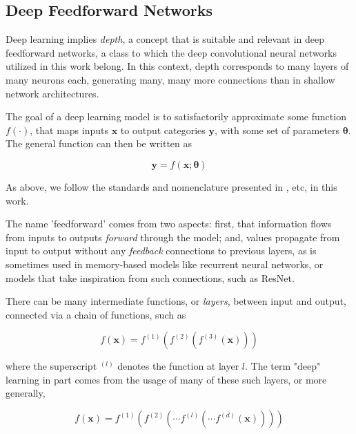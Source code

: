 \subsection{Deep Feedforward Networks}

Deep learning implies \textit{depth}, a concept that is suitable and relevant in deep feedforward networks, a class to which the deep convolutional neural networks utilized in this work belong. 
In this context, depth corresponds to many layers of many neurons each, generating many, many more connections than in shallow network architectures.

The goal of a deep learning model is to satisfactorily approximate some function $f(\cdot)$, that maps inputs $\textbf{x}$ to output categories $\textbf{y}$, with some set of parameters $\bm{\theta}$.
The general function can then be written as

\begin{equation}
\textbf{y} = f(\textbf{x};\bm{\theta})
\end{equation}

As above, we follow the standards and nomenclature presented in \cite{goodfellow2016}, etc, in this work.

The name 'feedforward' comes from two aspects: first, that information flows from inputs to outputs \textit{forward} through the model; and, values propagate from input to output without any \textit{feedback} connections to previous layers, as is sometimes used in memory-based models like recurrent neural networks\cite{graves2009novel}, or models that take inspiration from such connections, such as ResNet\cite{he2016deep}.

There can be many intermediate functions, or \textit{layers}, between input and output, connected via a chain of functions, such as

\begin{equation}
f(\textbf{x}) = f^{(1)}(f^{(2)}(f^{(3)}(\textbf{x})))
\end{equation}

where the superscript $^{(l)}$ denotes the function at layer $l$. The term "deep" learning in part comes from the usage of many of these such layers, or more generally,

\begin{equation}
f(\textbf{x}) = f^{(1)}(f^{(2)}(\cdots f^{(l)}( \cdots f^{(d)}(\textbf{x}))))
\end{equation}

